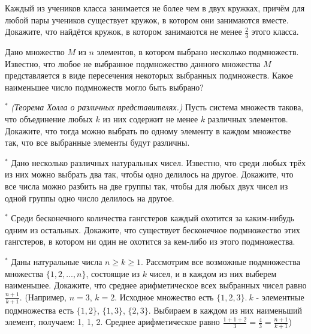 
\begin{thm}
Каждый из учеников класса занимается не более чем в двух кружках, причём для любой пары учеников существует кружок, в котором они занимаются вместе. Докажите, что найдётся кружок, в котором
занимаются не менее $\frac{2}{3}$ этого класса.
\end{thm}

\begin{thm}
Дано множество $M$ из $n$ элементов, в котором выбрано несколько подмножеств. Известно, что любое не выбранное подмножество данного множества $M$ представляется в виде пересечения некоторых выбранных подмножеств. Какое наименьшее число подмножеств могло быть выбрано?
\end{thm}

\begin{thm}$^{\ast}$
\textit{(Теорема Холла о различных представителях.)} Пусть система множеств такова, что объединение любых $k$ из них содержит не менее $k$ различных элементов. Докажите, что тогда можно выбрать по одному элементу в каждом множестве так, что все выбранные элементы будут различны.
\end{thm}

\begin{thm}$^{\ast}$
Дано несколько различных натуральных чисел. Известно, что среди любых трёх из них можно выбрать два так, чтобы одно делилось на другое. Докажите, что все числа можно разбить на две группы так, чтобы для любых двух чисел из одной группы одно число делилось на другое.
\end{thm}

\begin{thm}$^{\ast}$
Среди бесконечного количества гангстеров каждый охотится за каким-нибудь одним из остальных. Докажите, что существует бесконечное подмножество этих гангстеров, в котором ни один не охотится за кем-либо из этого подмножества.
\end{thm}

\begin{thm}$^{\ast}$
Даны натуральные числа $n \geq k \geq 1$. Рассмотрим все возможные подмножества множества $\{1, 2, ... , n\}$, состоящие из $k$ чисел, и в каждом из них выберем наименьшее. Докажите, что среднее арифметическое всех выбранных чисел равно $\frac{n+1}{k+1}$. (Например, $n = 3$, $k = 2$. Исходное множество есть $\{1, 2, 3\}.~k$ - элементные подмножества есть $\{1, 2\}$, $\{1, 3\}$, $\{2, 3\}$. Выбираем в каждом из них наименьший элемент, получаем:
1, 1, 2. Среднее арифметическое равно $\frac{1+1+2}{3} = \frac{4}{3} = \frac{n+1}{k+1}$)
\end{thm}